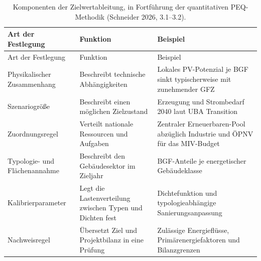 \documentclass[
  ngerman,
  a4paper,
  DIV=11]{scrreprt}
\begin{document}
\begin{longtable}[]{@{}
  >{\raggedright\arraybackslash}p{}
  >{\raggedright\arraybackslash}p{}
  >{\raggedright\arraybackslash}p{}@{}}
\caption{Komponenten der Zielwertableitung, in Fortführung der
quantitativen PEQ-Methodik (Schneider 2026,
3.1--3.2).}\label{tbl-arten-festlegungen}\tabularnewline
\toprule\noalign{}
\begin{minipage}[b]{\linewidth}\raggedright
Art der Festlegung
\end{minipage} & \begin{minipage}[b]{\linewidth}\raggedright
Funktion
\end{minipage} & \begin{minipage}[b]{\linewidth}\raggedright
Beispiel
\end{minipage} \\
\midrule\noalign{}
\endfirsthead
\toprule\noalign{}
\begin{minipage}[b]{\linewidth}\raggedright
Art der Festlegung
\end{minipage} & \begin{minipage}[b]{\linewidth}\raggedright
Funktion
\end{minipage} & \begin{minipage}[b]{\linewidth}\raggedright
Beispiel
\end{minipage} \\
\midrule\noalign{}
\endhead
\bottomrule\noalign{}
\endlastfoot
Physikalischer Zusammenhang & Beschreibt technische Abhängigkeiten &
Lokales PV-Potenzial je BGF sinkt typischerweise mit zunehmender GFZ \\
Szenariogröße & Beschreibt einen möglichen Zielzustand & Erzeugung und
Strombedarf 2040 laut UBA Transition \\
Zuordnungsregel & Verteilt nationale Ressourcen und Aufgaben & Zentraler
Erneuerbaren-Pool abzüglich Industrie und ÖPNV für das MIV-Budget \\
Typologie- und Flächenannahme & Beschreibt den Gebäudesektor im Zieljahr
& BGF-Anteile je energetischer Gebäudeklasse \\
Kalibrierparameter & Legt die Lastenverteilung zwischen Typen und
Dichten fest & Dichtefunktion und typologieabhängige
Sanierungsanpassung \\
Nachweisregel & Übersetzt Ziel und Projektbilanz in eine Prüfung &
Zulässige Energieflüsse, Primärenergiefaktoren und Bilanzgrenzen \\
\end{longtable}
\end{document}
